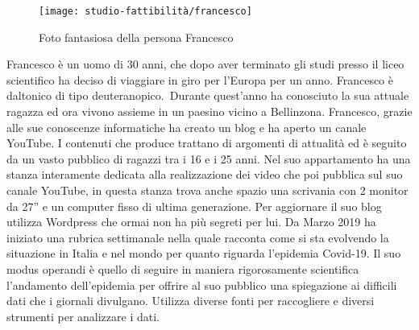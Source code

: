 \begin{wrapfigure}{l}{8cm}
    \texttt{[image: studio-fattibilità/francesco]}
    \caption{Foto fantasiosa della persona Francesco}
\end{wrapfigure}

Francesco è un uomo di 30 anni, che dopo aver terminato gli studi presso il liceo scientifico ha deciso di viaggiare in giro per l'Europa per un anno. Francesco è daltonico di tipo deuteranopico. Durante quest'anno ha conosciuto la sua attuale ragazza ed ora vivono assieme in un paesino vicino a Bellinzona. Francesco, grazie alle sue conoscenze informatiche ha creato un blog e ha aperto un canale YouTube. I contenuti che produce trattano di argomenti di attualità ed è seguito da un vasto pubblico di ragazzi tra i 16 e i 25 anni. Nel suo appartamento ha una stanza interamente  dedicata alla realizzazione dei video che poi pubblica sul suo canale YouTube, in questa stanza trova anche spazio una scrivania con 2 monitor da 27'' e un computer fisso di ultima generazione. Per aggiornare il suo blog utilizza Wordpress che ormai non ha più segreti per lui.
Da Marzo 2019 ha iniziato una rubrica settimanale nella quale racconta come si sta evolvendo la situazione in Italia e nel mondo per quanto riguarda l'epidemia Covid-19.  Il suo modus operandi è quello di seguire in maniera rigorosamente scientifica l'andamento dell'epidemia per offrire al suo pubblico una spiegazione ai difficili dati che i giornali divulgano. Utilizza diverse fonti per raccogliere e diversi strumenti per analizzare i dati. 

